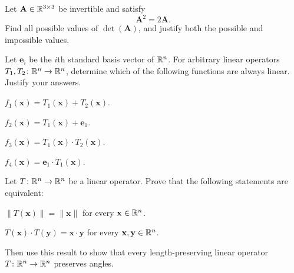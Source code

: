 \begin{problem}
Let $\mathbf A\in\mathbb{R}^{3\times3}$ be invertible and satisfy
\[
\mathbf A^2=2\mathbf A.
\]
Find all possible values of $\det(\mathbf A)$, and justify both the possible and impossible values.
\end{problem}

\begin{problem}
Let $\mathbf e_i$ be the $i$th standard basis vector of $\mathbb{R}^n$. For arbitrary linear operators $T_1,T_2\colon\mathbb{R}^n\to\mathbb{R}^n$, determine which of the following functions are always linear. Justify your answers.
\begin{problemchoices}
\item $f_1(\mathbf x)=T_1(\mathbf x)+T_2(\mathbf x)$.
\item $f_2(\mathbf x)=T_1(\mathbf x)+\mathbf e_1$.
\item $f_3(\mathbf x)=T_1(\mathbf x)\cdot T_2(\mathbf x)$.
\item $f_4(\mathbf x)=\mathbf e_1\cdot T_1(\mathbf x)$.
\end{problemchoices}
\end{problem}

\begin{problem}
Let $T\colon\mathbb{R}^n\to\mathbb{R}^n$ be a linear operator. Prove that the following statements are equivalent:
\begin{problemclauses}
\item $\|T(\mathbf x)\|=\|\mathbf x\|$ for every $\mathbf x\in\mathbb{R}^n$.
\item $T(\mathbf x)\cdot T(\mathbf y)=\mathbf x\cdot\mathbf y$ for every $\mathbf x,\mathbf y\in\mathbb{R}^n$.
\end{problemclauses}
Then use this result to show that every length-preserving linear operator $T\colon\mathbb{R}^n\to\mathbb{R}^n$ preserves angles.
\end{problem}

